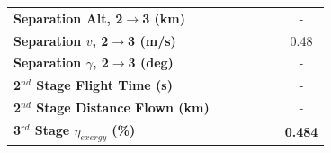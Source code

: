 \begin{table}[ht]
\begin{tabular}{l c c c c c c}
		\textbf{Separation Alt, 2$\rightarrow$3 (km)}
		& \secondthirdSeparationAltTThreeNinetyNoReturn
		& \secondthirdSeparationAltTThreeNinetyFiveNoReturn
		& \secondthirdSeparationAltTThreeStandardNoReturn
		& \secondthirdSeparationAltTThreeOneHundredFiveNoReturn
		& \secondthirdSeparationAltTThreeOneHundredTenNoReturn
		& -
		\\
		\textbf{Separation $v$, 2$\rightarrow$3 (m/s)}
		& \secondthirdSeparationvTThreeNinetyNoReturn
		& \secondthirdSeparationvTThreeNinetyFiveNoReturn
		& \secondthirdSeparationvTThreeStandardNoReturn
		& \secondthirdSeparationvTThreeOneHundredFiveNoReturn
		& \secondthirdSeparationvTThreeOneHundredTenNoReturn
		&0.48
		\\
		\textbf{Separation $\gamma$, 2$\rightarrow$3 (deg)}
		& \secondthirdSeparationgammaTThreeNinetyNoReturn
		& \secondthirdSeparationgammaTThreeNinetyFiveNoReturn
		& \secondthirdSeparationgammaTThreeStandardNoReturn
		& \secondthirdSeparationgammaTThreeOneHundredFiveNoReturn
		& \secondthirdSeparationgammaTThreeOneHundredTenNoReturn
		& -
		\\
		\textbf{2$^{nd}$ Stage Flight Time (s)}
		& \secondFlightTimeTThreeNinetyNoReturn
		& \secondFlightTimeTThreeNinetyFiveNoReturn
		& \secondFlightTimeTThreeStandardNoReturn
		& \secondFlightTimeTThreeOneHundredFiveNoReturn
		& \secondFlightTimeTThreeOneHundredTenNoReturn
		& -
		\\
		\textbf{2$^{nd}$ Stage Distance Flown (km)}
		& \SecondDistTThreeNinetyNoReturn
		& \SecondDistTThreeNinetyFiveNoReturn
		& \SecondDistTThreeStandardNoReturn
		& \SecondDistTThreeOneHundredFiveNoReturn
		& \SecondDistTThreeOneHundredTenNoReturn
		& -
		\\
		\hline 
		\textbf{3$^{rd}$ Stage $\eta_{exergy}$ (\%)}
		& \textbf{\thirddExergyEffTThreeNinetyNoReturn}
		& \textbf{\thirddExergyEffTThreeNinetyFiveNoReturn}
		& \textbf{\thirddExergyEffTThreeStandardNoReturn}
		& \textbf{\thirddExergyEffTThreeOneHundredFiveNoReturn}
		& \textbf{\thirddExergyEffTThreeOneHundredTenNoReturn}
		& \textbf{0.484}
		\\
	

\end{tabular}
\end{table}
